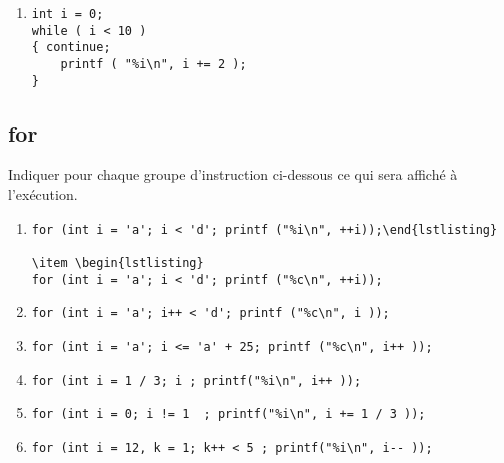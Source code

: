 \begin{multicols}{2}
\begin{enumerate}[label=(\roman*)]
    \item \begin{lstlisting}
int i = 0;
while ( i < 10 )
{ continue;
    printf ( "%i\n", i += 2 );
}
\end{lstlisting}

\end{enumerate}


\subsection{for}

Indiquer pour chaque groupe d'instruction ci-dessous ce qui sera affiché à l'exécution.

\begin{enumerate}[label=(\roman*)]

\item \begin{lstlisting}
for (int i = 'a'; i < 'd'; printf ("%i\n", ++i));\end{lstlisting}

\item \begin{lstlisting}
for (int i = 'a'; i < 'd'; printf ("%c\n", ++i));
\end{lstlisting}

\item \begin{lstlisting}
for (int i = 'a'; i++ < 'd'; printf ("%c\n", i ));
\end{lstlisting}

\item \begin{lstlisting}
for (int i = 'a'; i <= 'a' + 25; printf ("%c\n", i++ ));
\end{lstlisting}

\item \begin{lstlisting}
for (int i = 1 / 3; i ; printf("%i\n", i++ ));
\end{lstlisting}

\item \begin{lstlisting}
for (int i = 0; i != 1  ; printf("%i\n", i += 1 / 3 ));
\end{lstlisting}

\item \begin{lstlisting}
for (int i = 12, k = 1; k++ < 5 ; printf("%i\n", i-- ));
\end{lstlisting}


\end{enumerate}
\end{multicols}
